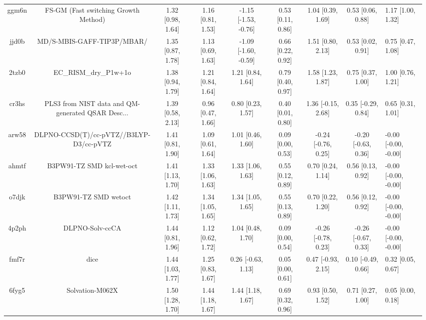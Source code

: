 \documentclass{article}
\begin{document}
\begin{center}
\begin{longtable}{|cccccccc|}
 ggm6n &               FS-GM (Fast switching Growth Method) &  1.32 [0.98, 1.64] &  1.16 [0.81, 1.53] &  -1.15 [-1.53, -0.76] &  0.53 [0.11, 0.86] &    1.04 [0.39, 1.69] &    0.53 [0.06, 0.88] &     1.17 [1.00, 1.32] \\
 jjd0b &                         MD/S-MBIS-GAFF-TIP3P/MBAR/ &  1.35 [0.87, 1.78] &  1.13 [0.69, 1.63] &  -1.09 [-1.60, -0.59] &  0.66 [0.22, 0.92] &    1.51 [0.80, 2.13] &    0.53 [0.02, 0.91] &     0.75 [0.47, 1.08] \\
 2tzb0 &                              EC\_RISM\_dry\_P1w+1o &  1.38 [0.94, 1.79] &  1.21 [0.84, 1.64] &     1.21 [0.84, 1.64] &  0.79 [0.40, 0.97] &    1.58 [1.23, 1.87] &    0.75 [0.37, 1.00] &     1.00 [0.76, 1.21] \\
 cr3hs &  PLS3 from NIST data and QM-generated QSAR Desc... &  1.39 [0.58, 2.13] &  0.96 [0.47, 1.66] &     0.80 [0.23, 1.57] &  0.40 [0.01, 0.80] &   1.36 [-0.15, 2.68] &   0.35 [-0.29, 0.84] &     0.65 [0.31, 1.01] \\
 arw58 &            DLPNO-CCSD(T)/cc-pVTZ//B3LYP-D3/cc-pVTZ &  1.41 [0.81, 1.90] &  1.09 [0.61, 1.64] &     1.01 [0.46, 1.60] &  0.09 [0.00, 0.53] &  -0.24 [-0.76, 0.25] &  -0.20 [-0.63, 0.36] &  -0.00 [-0.00, -0.00] \\
 ahmtf &                          B3PW91-TZ SMD kcl-wet-oct &  1.41 [1.13, 1.70] &  1.33 [1.06, 1.63] &     1.33 [1.06, 1.63] &  0.55 [0.12, 0.89] &    0.70 [0.24, 1.14] &    0.56 [0.13, 0.92] &  -0.00 [-0.00, -0.00] \\
 o7djk &                               B3PW91-TZ SMD wetoct &  1.42 [1.11, 1.73] &  1.34 [1.05, 1.65] &     1.34 [1.05, 1.65] &  0.55 [0.13, 0.89] &    0.70 [0.22, 1.20] &    0.56 [0.12, 0.92] &  -0.00 [-0.00, -0.00] \\
 4p2ph &                                    DLPNO-Solv-ccCA &  1.44 [0.81, 1.96] &  1.12 [0.62, 1.72] &     1.04 [0.48, 1.70] &  0.09 [0.00, 0.54] &  -0.26 [-0.78, 0.23] &  -0.26 [-0.67, 0.33] &  -0.00 [-0.00, -0.00] \\
 fmf7r &                                               dice &  1.44 [1.03, 1.77] &  1.25 [0.83, 1.67] &    0.26 [-0.63, 1.13] &  0.05 [0.00, 0.61] &   0.47 [-0.93, 2.15] &   0.10 [-0.49, 0.66] &     0.32 [0.05, 0.67] \\
 6fyg5 &                                    Solvation-M062X &  1.50 [1.28, 1.70] &  1.44 [1.18, 1.67] &     1.44 [1.18, 1.67] &  0.69 [0.32, 0.96] &    0.93 [0.50, 1.52] &    0.71 [0.27, 1.00] &     0.05 [0.00, 0.18] \\

\end{longtable}
\end{center}
\end{document}
